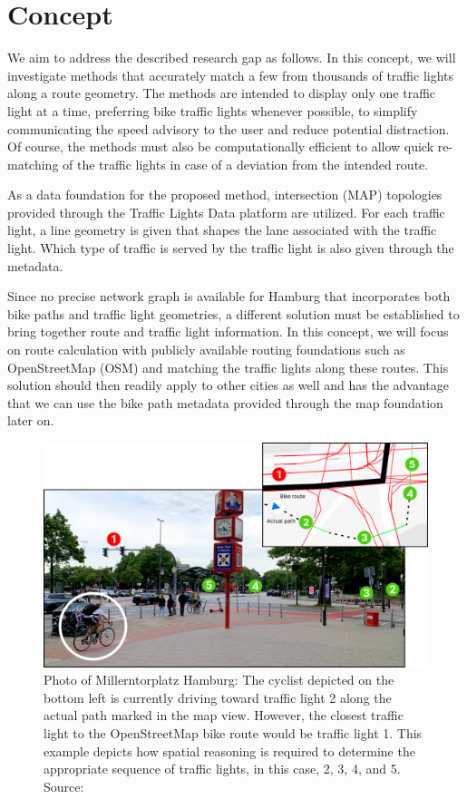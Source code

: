 \section{Concept}

We aim to address the described research gap as follows. In this concept, we will investigate methods that accurately match a few from thousands of traffic lights along a route geometry. The methods are intended to display only one traffic light at a time, preferring bike traffic lights whenever possible, to simplify communicating the speed advisory to the user and reduce potential distraction. Of course, the methods must also be computationally efficient to allow quick re-matching of the traffic lights in case of a deviation from the intended route.

As a data foundation for the proposed method, intersection (MAP) topologies provided through the Traffic Lights Data platform are utilized. For each traffic light, a line geometry is given that shapes the lane associated with the traffic light. Which type of traffic is served by the traffic light is also given through the metadata.

Since no precise network graph is available for Hamburg that incorporates both bike paths and traffic light geometries, a different solution must be established to bring together route and traffic light information. In this concept, we will focus on route calculation with publicly available routing foundations such as OpenStreetMap (OSM) and matching the traffic lights along these routes. This solution should then readily apply to other cities as well and has the advantage that we can use the bike path metadata provided through the map foundation later on.

\begin{figure}[t]
\centering
\includegraphics[width=\linewidth]{images/sg-selection-example.png}
\caption{Photo of Millerntorplatz Hamburg: The cyclist depicted on the bottom left is currently driving toward traffic light 2 along the actual path marked in the map view. However, the closest traffic light to the OpenStreetMap bike route would be traffic light 1. This example depicts how spatial reasoning is required to determine the appropriate sequence of traffic lights, in this case, 2, 3, 4, and 5. Source: \cite{matthes2023geo}}
\label{fig:sg-selection-example}
\end{figure}

